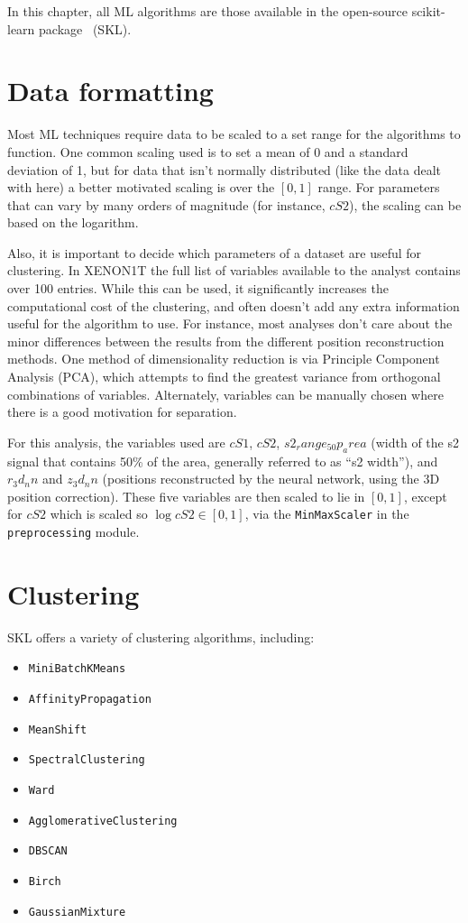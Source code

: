 In this chapter, all ML algorithms are those available in the open-source scikit-learn package~\cite{skl} (SKL).

\section{Data formatting}

Most ML techniques require data to be scaled to a set range for the algorithms to function. One common scaling used is to set a mean of 0 and a standard deviation of 1, but for data that isn't normally distributed (like the data dealt with here) a better motivated scaling is over the $[0,1]$ range. For parameters that can vary by many orders of magnitude (for instance, $cS2$), the scaling can be based on the logarithm.

Also, it is important to decide which parameters of a dataset are useful for clustering. In XENON1T the full list of variables available to the analyst contains over 100 entries. While this can be used, it significantly increases the computational cost of the clustering, and often doesn't add any extra information useful for the algorithm to use. For instance, most analyses don't care about the minor differences between the results from the different position reconstruction methods. One method of dimensionality reduction is via Principle Component Analysis (PCA), which attempts to find the greatest variance from orthogonal combinations of variables. Alternately, variables can be manually chosen where there is a good motivation for separation.

For this analysis, the variables used are $cS1$, $cS2$, $s2_range_50p_area$ (width of the s2 signal that contains 50\% of the area, generally referred to as ``s2 width''), and $r_3d_nn$ and $z_3d_nn$ (positions reconstructed by the neural network, using the 3D position correction). These five variables are then scaled to lie in $[0,1]$, except for $cS2$ which is scaled so $\log cS2 \in [0,1]$, via the \texttt{MinMaxScaler} in the \texttt{preprocessing} module.

\section{Clustering}

SKL offers a variety of clustering algorithms, including:
\begin{itemize}
    \item \texttt{MiniBatchKMeans}
    \item \texttt{AffinityPropagation}
    \item \texttt{MeanShift}
    \item \texttt{SpectralClustering}
    \item \texttt{Ward}
    \item \texttt{AgglomerativeClustering}
    \item \texttt{DBSCAN}
    \item \texttt{Birch}
    \item \texttt{GaussianMixture}
\end{itemize}

